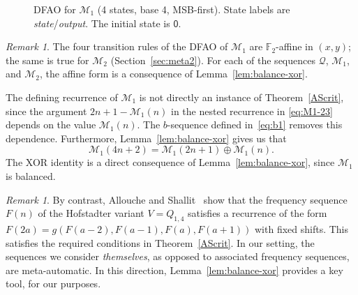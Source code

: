 \documentclass[12pt,reqno]{article}
\theoremstyle{plain}
\theoremstyle{definition}
\theoremstyle{remark}
\newtheorem{remark}[theorem]{Remark}
\begin{document}
\begin{figure}[ht]
\centering
{}
\caption{DFAO for $\mathcal{M}_{1}$ (4 states, base 4, MSB-first). State labels 
 are \emph{state}/\emph{output}. The initial state is $\mathsf{0}$.} 
\end{figure}

\begin{remark}
 The four transition rules of the DFAO of $\mathcal{M}_{1}$ are $\mathbb{F}_2$-affine in
 $(x,y)$; the same is true for $\mathcal{M}_{2}$ (Section~\ref{sec:meta2}). For
 each of the sequences $\mathcal{Q}$, $\mathcal{M}_{1}$, and $\mathcal{M}_{2}$, the affine
 form is a consequence of Lemma~\ref{lem:balance-xor}.
\end{remark}

 The defining recurrence of $\mathcal{M}_{1}$ is not directly an instance of Theorem~\ref{AScrit}, since the argument $2n + 
 1-\mathcal{M}_{1}(n)$ in the nested recurrence in \eqref{eq:M1-23} depends on the value $\mathcal{M}_{1}(n)$. The $b$-sequence
 defined in~\eqref{eq:b1} removes this dependence. 
 Furthermore, Lemma~\ref{lem:balance-xor} gives us that 
\[
 \mathcal{M}_{1}(4n+2) = \mathcal{M}_{1}(2n+1) \oplus \mathcal{M}_{1}(n).
\]
 The XOR identity is a direct consequence of Lemma~\ref{lem:balance-xor}, since
 $\mathcal{M}_{1}$ is balanced. 

\begin{remark}
 By contrast, Allouche and Shallit~\cite{AlloucheShallit2012} show that the frequency sequence $F(n)$ of the Hofstadter variant $V =
 Q_{1,4}$ satisfies a recurrence of the form $F(2a) = g(F(a-2),F(a-1),F(a),F(a+1))$ with fixed shifts. This satisfies the required conditions in 
 Theorem~\ref{AScrit}. In our setting, the sequences we consider \emph{themselves}, as opposed to 
 associated frequency sequences, 
 are meta-automatic. In this direction, Lemma~\ref{lem:balance-xor} provides a key tool, for our purposes. 
\end{remark}
\end{document}
